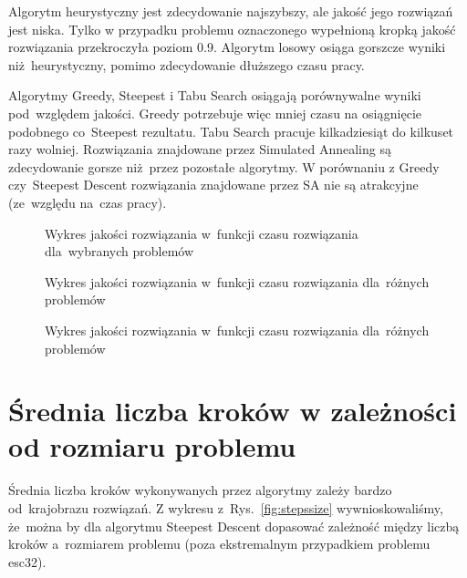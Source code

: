 \documentclass[a4paper,10pt]{article}
\begin{document}
Algorytm heurystyczny jest zdecydowanie najszybszy, ale jakość jego rozwiązań jest niska. 
Tylko w przypadku problemu oznaczonego wypełnioną kropką jakość rozwiązania przekroczyła poziom \num{0.9}.
Algorytm losowy osiąga gorszcze wyniki niż~heurystyczny, pomimo zdecydowanie dłuższego czasu pracy.

Algorytmy Greedy, Steepest i Tabu Search osiągają porównywalne wyniki pod~względem jakości.
Greedy potrzebuje więc mniej czasu na osiągnięcie podobnego co~Steepest rezultatu.
Tabu Search pracuje kilkadziesiąt do kilkuset razy wolniej.
Rozwiązania znajdowane przez Simulated Annealing są zdecydowanie gorsze niż~przez pozostałe algorytmy.
W porównaniu z Greedy czy~Steepest Descent rozwiązania znajdowane przez SA nie są atrakcyjne (ze~względu na~czas pracy).

\begin{figure}[!htpb]
\begin{center}

\caption{Wykres jakości rozwiązania w~funkcji czasu rozwiązania dla~wybranych problemów}
\label{fig:qualitytime}
\end{center}
\end{figure}

\begin{figure}
\begin{center}

\caption{Wykres jakości rozwiązania w~funkcji czasu rozwiązania dla~różnych problemów}
\label{fig:qualitytimefull}
\end{center}
\end{figure}

\begin{figure}
\begin{center}

\caption{Wykres jakości rozwiązania w~funkcji czasu rozwiązania dla~różnych problemów}
\label{fig:qualitytimefullMETA}
\end{center}
\end{figure}

\section{Średnia liczba kroków w zależności od rozmiaru problemu}
Średnia liczba kroków wykonywanych przez algorytmy zależy bardzo od~krajobrazu rozwiązań.
Z wykresu z~Rys.~\ref{fig:stepssize} wywnioskowaliśmy, że~można by dla algorytmu Steepest Descent dopasować zależność między liczbą kroków
a~rozmiarem problemu (poza ekstremalnym przypadkiem problemu esc32).
\end{document}
